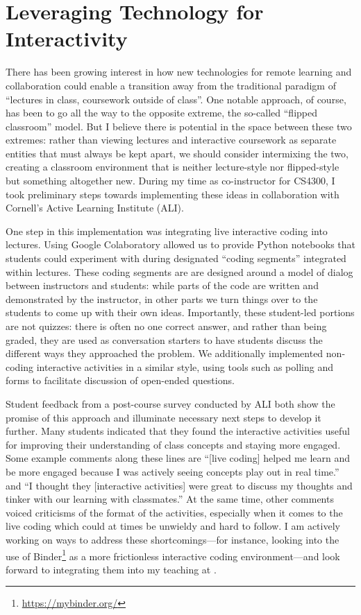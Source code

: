 \documentclass[12pt,letterpaper]{article}
\begin{document}
\section{Leveraging Technology for Interactivity}
There has been growing interest in how new technologies for remote learning and collaboration could enable a transition away from the traditional paradigm of ``lectures in class, coursework outside of class''.
One notable approach, of course, has been to go all the way to the opposite extreme, the so-called ``flipped classroom'' model.
But I believe there is potential in the space between these two extremes: rather than viewing lectures and interactive coursework as separate entities that must always be kept apart, we should consider intermixing the two, creating a classroom environment that is neither lecture-style nor flipped-style but something altogether new.
During my time as co-instructor for CS4300, I took preliminary steps towards implementing these ideas in collaboration with Cornell's Active Learning Institute (ALI).

One step in this implementation was integrating live interactive coding into lectures.
Using Google Colaboratory allowed us to provide Python notebooks that students could experiment with during designated ``coding segments'' integrated within lectures.
These coding segments are are designed around a model of dialog between instructors and students: while parts of the code are written and demonstrated by the instructor, in other parts we turn things over to the students to come up with their own ideas.
Importantly, these student-led portions are not quizzes: there is often no one correct answer, and rather than being graded, they are used as conversation starters to have students discuss the different ways they approached the problem.
We additionally implemented non-coding interactive activities in a similar style, using tools such as polling and forms to facilitate discussion of open-ended questions.

Student feedback from a post-course survey conducted by ALI both show the promise of this approach and illuminate necessary next steps to develop it further.
Many students indicated that they found the interactive activities useful for improving their understanding of class concepts and staying more engaged.
Some example comments along these lines are ``[live coding] helped me learn and be more engaged because I was actively seeing concepts play out in real time.'' and ``I thought they [interactive activities] were great to discuss my thoughts and tinker with our learning with classmates.''
At the same time, other comments voiced criticisms of the format of the activities, especially when it comes to the live coding which could at times be unwieldy and hard to follow.
I am actively working on ways to address these shortcomings---for instance, looking into the use of Binder\footnote{\url{https://mybinder.org/}} as a more frictionless interactive coding environment---and look forward to integrating them into my teaching at \schoolname.
\end{document}
